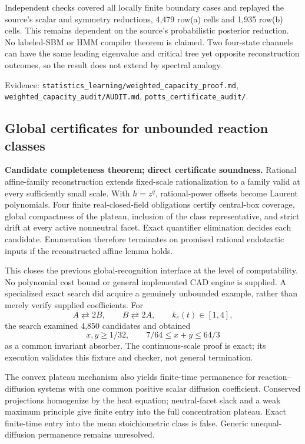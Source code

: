 \documentclass[11pt]{article}
\begin{document}
Independent checks covered all locally finite boundary cases and replayed the source's scalar and symmetry reductions, 4,479 row(a) cells and 1,935 row(b) cells. This remains dependent on the source's probabilistic posterior reduction. No labeled-SBM or HMM compiler theorem is claimed. Two four-state channels can have the same leading eigenvalue and critical tree yet opposite reconstruction outcomes, so the result does not extend by spectral analogy.

Evidence: \texttt{statistics\_learning/weighted\_capacity\_proof.md}, \texttt{weighted\_capacity\_audit/AUDIT.md}, \texttt{potts\_certificate\_audit/}.

\subsection{Global certificates for unbounded reaction classes}
\textbf{Candidate completeness theorem; direct certificate soundness.} Rational affine-family reconstruction extends fixed-scale rationalization to a family valid at every sufficiently small scale. With $h=z^q$, rational-power offsets become Laurent polynomials. Four finite real-closed-field obligations certify central-box coverage, global compactness of the plateau, inclusion of the class representative, and strict drift at every active nonneutral facet. Exact quantifier elimination decides each candidate. Enumeration therefore terminates on promised rational endotactic inputs if the reconstructed affine lemma holds.

This closes the previous global-recognition interface at the level of computability. No polynomial cost bound or general implemented CAD engine is supplied. A specialized exact search did acquire a genuinely unbounded example, rather than merely verify supplied coefficients. For
\[
 A\rightleftarrows2B,\qquad B\rightleftarrows2A,
 \qquad k_e(t)\in[1,4],
\]
the search examined 4,850 candidates and obtained
\[
 x,y\ge1/32,\qquad7/64\le x+y\le64/3
\]
as a common invariant absorber. The continuous-scale proof is exact; its execution validates this fixture and checker, not general termination.

The convex plateau mechanism also yields finite-time permanence for reaction--diffusion systems with one common positive scalar diffusion coefficient. Conserved projections homogenize by the heat equation; neutral-facet slack and a weak maximum principle give finite entry into the full concentration plateau. Exact finite-time entry into the mean stoichiometric class is false. Generic unequal-diffusion permanence remains unresolved.
\end{document}
